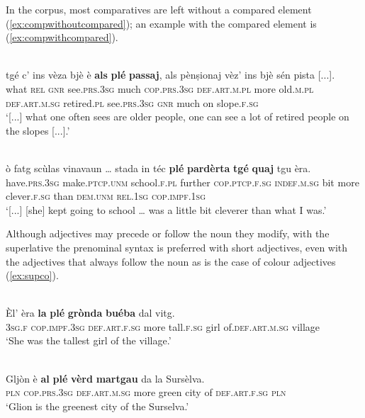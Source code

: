 In the corpus, most comparatives are left without a compared element (\ref{ex:compwithoutcompared}); an example with the compared element is (\ref{ex:compwithcompared}).

\ea
\label{ex:compwithoutcompared}
\\
	\gll [...] tgé c’ ins vèza bjè è \textbf{als} \textbf{plé} \textbf{passaj}, als pènṣionaj vèz’ ins bjè sén pista [...].\\
{} what \textsc{rel} \textsc{gnr} see.\textsc{prs.3sg} much \textsc{cop.prs.3sg} \textsc{def.art.m.pl} more old.\textsc{m.pl} \textsc{def.art.m.sg} retired.\textsc{pl} see.\textsc{prs.3sg} \textsc{gnr} much on slope.\textsc{f.sg}\\
\glt `[...] what one often sees are older people, one can see a lot of retired people on the slopes [...].'
\z

\ea
\label{ex:compwithcompared}
\\
\gll    [...] ò fatg scùlas vinavaun … stada in téc \textbf{plé} \textbf{pardèrta} \textbf{tgé} \textbf{quaj} tgu èra.\\
{} have.\textsc{prs.3sg} make.\textsc{ptcp.unm} school.\textsc{f.pl} further {} \textsc{cop.ptcp.f.sg} \textsc{indef.m.sg} bit more  clever.\textsc{f.sg} than \textsc{dem.unm} \textsc{rel.1sg} \textsc{cop.impf.1sg} \\
\glt `[...] [she] kept going to school … was a little bit cleverer than what I was.'
\z

Although adjectives may precede or follow the noun they modify, with the superlative the prenominal syntax is preferred with short adjectives, even with the adjectives that always follow the noun as is the case of colour adjectives (\ref{ex:supco}).

\ea
\label{l}
\\
	\gll Èl’ èra \textbf{la} \textbf{plé} \textbf{grònda} \textbf{buéba} dal vitg.  \\
\textsc{3sg.f} \textsc{cop.impf.3sg} \textsc{def.art.f.sg} more tall.\textsc{f.sg} girl of.\textsc{def.art.m.sg} village	\\
\glt `She was the tallest girl of the village.'
\z

\ea
\label{ex:supco}
\\
\gll Gljòn è \textbf{al} \textbf{plé} \textbf{vèrd} \textbf{martgau} da la Sursèlva.\\
\textsc{pln} \textsc{cop.prs.3sg} \textsc{def.art.m.sg} more green city of \textsc{def.art.f.sg} \textsc{pln}\\
\glt `Glion is the greenest city of the Surselva.'
\z

